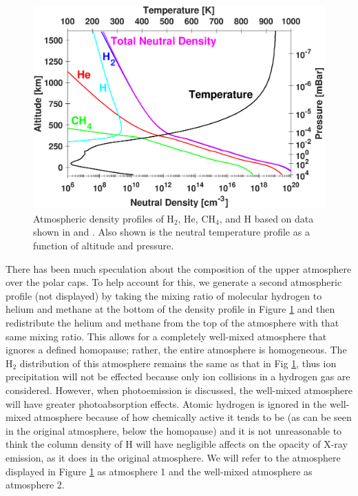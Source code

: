 \documentclass[draft]{agujournal2018}
\begin{document}
\begin{figure}[ht]
\centering
\includegraphics[width=\textwidth]{Figures/Atmosphere.eps}
\caption{Atmospheric density profiles of H$_{2}$, He, CH$_{4}$, and H based on data shown in \citet{maurellis2001} and \citet{sinclair2018}. Also shown is the neutral temperature profile as a function of altitude and pressure.}
\label{fig:atm}
\end{figure}

There has been much speculation about the composition of the upper atmosphere over the polar caps.
To help account for this, we generate a second atmospheric profile (not displayed) by taking the mixing ratio of molecular hydrogen to helium and methane at the bottom of the density profile in Figure \ref{fig:atm} and then redistribute the helium and methane from the top of the atmosphere with that same mixing ratio.
This allows for a completely well-mixed atmosphere that ignores a defined homopause; rather, the entire atmosphere is homogeneous.
The H$_{2}$ distribution of this atmosphere remains the same as that in Fig \ref{fig:atm}, thus ion precipitation will not be effected because only ion collisions in a hydrogen gas are considered.
However, when photoemission is discussed, the well-mixed atmosphere will have greater photoabsorption effects.
Atomic hydrogen is ignored in the well-mixed atmosphere because of how chemically active it tends to be (as can be seen in the original atmosphere, below the homopause) and it is not unreasonable to think the column density of H will have negligible affects on the opacity of X-ray emission, as it does in the original atmosphere.
We will refer to the atmosphere displayed in Figure \ref{fig:atm} as atmosphere 1 and the well-mixed atmosphere as atmosphere 2.
\end{document}

